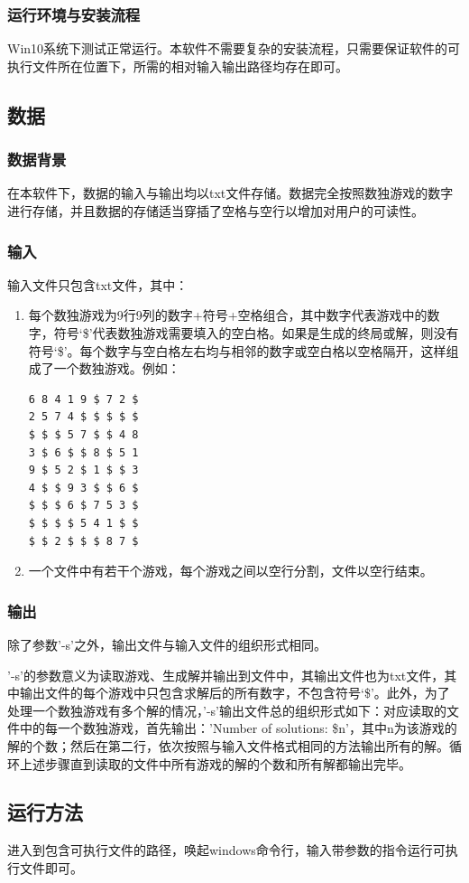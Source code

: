 \documentclass[a4paper]{article}
\begin{document}
\subsubsection{运行环境与安装流程}
Win10系统下测试正常运行。本软件不需要复杂的安装流程，只需要保证软件的可执行文件所在位置下，所需的相对输入输出路径均存在即可。
\subsection{数据}
\subsubsection{数据背景}
在本软件下，数据的输入与输出均以txt文件存储。数据完全按照数独游戏的数字进行存储，并且数据的存储适当穿插了空格与空行以增加对用户的可读性。
\subsubsection{输入}
输入文件只包含txt文件，其中：
\begin{enumerate}
\item 每个数独游戏为9行9列的数字+符号+空格组合，其中数字代表游戏中的数字，符号‘\$’代表数独游戏需要填入的空白格。如果是生成的终局或解，则没有符号‘\$’。每个数字与空白格左右均与相邻的数字或空白格以空格隔开，这样组成了一个数独游戏。例如：
\begin{lstlisting}
6 8 4 1 9 $ 7 2 $ 
2 5 7 4 $ $ $ $ $ 
$ $ $ 5 7 $ $ 4 8 
3 $ 6 $ $ 8 $ 5 1 
9 $ 5 2 $ 1 $ $ 3 
4 $ $ 9 3 $ $ 6 $ 
$ $ $ 6 $ 7 5 3 $ 
$ $ $ $ 5 4 1 $ $ 
$ $ 2 $ $ $ 8 7 $
\end{lstlisting}
\item 一个文件中有若干个游戏，每个游戏之间以空行分割，文件以空行结束。
\end{enumerate}
\subsubsection{输出}
除了参数'-s'之外，输出文件与输入文件的组织形式相同。
\par
'-s'的参数意义为读取游戏、生成解并输出到文件中，其输出文件也为txt文件，其中输出文件的每个游戏中只包含求解后的所有数字，不包含符号‘\$’。此外，为了处理一个数独游戏有多个解的情况，'-s'输出文件总的组织形式如下：对应读取的文件中的每一个数独游戏，首先输出：'Number of solutions: \$n'，其中n为该游戏的解的个数；然后在第二行，依次按照与输入文件格式相同的方法输出所有的解。循环上述步骤直到读取的文件中所有游戏的解的个数和所有解都输出完毕。
\subsection{运行方法}
进入到包含可执行文件的路径，唤起windows命令行，输入带参数的指令运行可执行文件即可。
\end{document}
